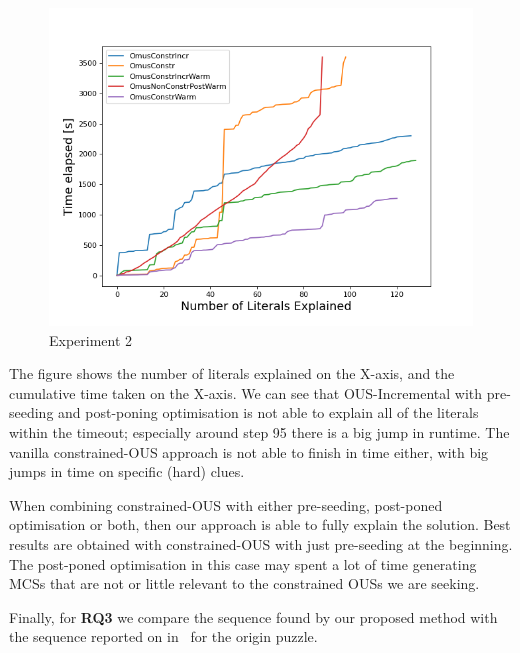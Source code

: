 \begin{figure}[t]
    \centering
    \includegraphics[width=\columnwidth]{figures/omusConstrCumulative.png}
    \caption{Experiment 2}
    \label{fig:exp2}
\end{figure}

The figure shows the number of literals explained on the X-axis, and the cumulative time taken on the X-axis. 
We can see that OUS-Incremental with pre-seeding and post-poning optimisation is not able to explain all of the literals within the timeout; especially around step 95 there is a big jump in runtime. The vanilla constrained-OUS approach is not able to finish in time either, with big jumps in time on specific (hard) clues.

When combining constrained-OUS with either pre-seeding, post-poned optimisation or both, then our approach is able to fully explain the solution. Best results are obtained with constrained-OUS with just pre-seeding at the beginning. The post-poned optimisation in this case may spent a lot of time generating MCSs that are not or little relevant to the constrained OUSs we are seeking.

Finally, for \textbf{RQ3} we compare the sequence found by our proposed method with the sequence reported on in~\cite{ecai/BogaertsGCG20} for the origin puzzle. 


%

